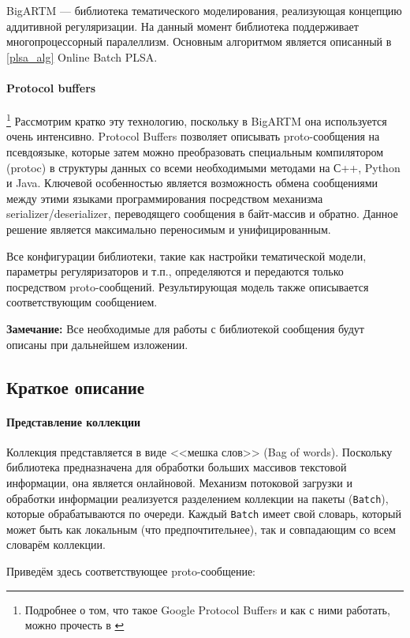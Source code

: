 BigARTM --- библиотека тематического моделирования, реализующая концепцию аддитивной регуляризации. На данный момент библиотека поддерживает многопроцессорный паралеллизм. Основным алгоритмом является описанный в \ref{plsa_alg} Online Batch PLSA.

\paragraph{Protocol buffers}
\footnote{Подробнее о том, что такое Google Protocol Buffers и как с ними работать, можно прочесть в \cite{protobuf}}
Рассмотрим кратко эту технологию, поскольку в BigARTM она используется очень интенсивно. Protocol Buffers позволяет описывать proto-сообщения на псевдоязыке, которые затем можно преобразовать специальным компилятором (protoc) в структуры данных со всеми необходимыми методами на С++, Python и Java. Ключевой особенностью является возможность обмена сообщениями между этими языками программирования посредством механизма serializer/deserializer, переводящего сообщения в байт-массив и обратно. Данное решение является максимально переносимым и унифицированным.

Все конфигурации библиотеки, такие как настройки тематической модели, параметры регуляризаторов и т.п., определяются и передаются только посредством proto-сообщений. Результирующая модель также описывается соответствующим сообщением. 

{\bf Замечание:} Все необходимые для работы с библиотекой сообщения будут описаны при дальнейшем изложении.

\subsection{Краткое описание}

\paragraph{Представление коллекции} Коллекция представляется в виде <<мешка слов>> (Bag of words). Поскольку библиотека предназначена для обработки больших массивов текстовой информации, она является онлайновой. Механизм потоковой загрузки и обработки информации реализуется разделением коллекции на пакеты (\verb|Batch|), которые обрабатываются по очереди. Каждый \verb|Batch| имеет свой словарь, который может быть как локальным (что предпочтительнее), так и совпадающим со всем словарём коллекции. 

Приведём здесь соответствующее proto-сообщение:


